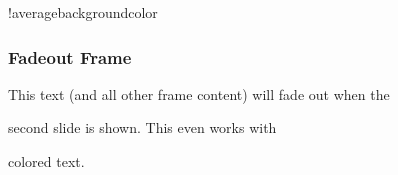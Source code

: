 \documentclass{beamer}
\begin{document}




% 



% 

\newcount\opaqueness 

\begin{frame} 



\begin{colormixin}{\the\opaqueness!averagebackgroundcolor} 

\frametitle{Fadeout Frame} 

This text (and all other frame content) will fade out when the 

second slide is shown. This even works with 

{\color{green!90!black}colored} \alert{text}. 

\end{colormixin} 

\end{frame} 

% 

\newcount\opaqueness 

\newdimen\offset 
\end{document}
